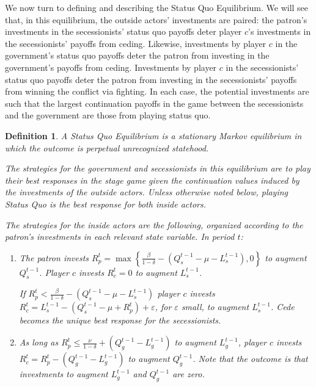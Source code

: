 \documentclass[11pt,letterpaper, notitlepage]{article}
\newtheorem{definition}{Definition}
\newcommand{\de}{\delta}
\newcommand{\ve}{\varepsilon}
\begin{document}
We now turn to defining and describing the Status Quo Equilibrium. We will see that, in this equilibrium, the outside actors' investments are paired: the patron's investments in the secessionists' status quo payoffs deter player $c$'s investments in the secessionists' payoffs from ceding. Likewise, investments by player $c$ in the government's status quo payoffs deter the patron from investing in the government's payoffs from ceding. Investments by player $c$ in the secessionists' status quo payoffs deter the patron from investing in the secessionists' payoffs from winning the conflict via fighting. In each case, the potential  investments are such that the largest continuation payoffs in the game between the secessionists and the government are those from playing status quo.

\begin{definition}
A Status Quo Equilibrium is a stationary Markov equilibrium in which the outcome is perpetual unrecognized statehood.

The strategies for the government and secessionists in this equilibrium are to play their best responses in the stage game given the continuation values induced by the investments of the outside actors. Unless otherwise noted below, playing Status Quo is the best response for both inside actors.

The strategies for the inside actors are the following, organized according to the patron's investments in each relevant state variable. In period $t$:

\begin{enumerate}
	\item The patron invests $R_p^t = \max\left\{\frac{\beta}{1-\de} - \left( Q_s^{t-1} - \mu - L_s^{t-1}\right),0\right\}$ to augment $Q_s^{t-1}$. Player $c$ invests $R_c^t =0$ to augment $L_s^{t-1}$.

If $R_p^t < \frac{\beta}{1-\de} - \left( Q_s^{t-1} - \mu - L_s^{t-1}\right)$ player $c$ invests $R_c^t = L_s^{t-1} - \left(Q_s^{t-1} - \mu + R_p^t \right) + \ve$, for $\ve$ small, to augment $L_s^{t-1}$. Cede becomes the unique best response for the secessionists.

	\item As long as $R_p^t \leq \frac{\nu}{1-\de} + \left( Q_g^{t-1} - L_g^{t-1}\right)$ to augment $L_g^{t-1}$, player $c$ invests $R_c^t = R_p^t - \left( Q_g^{t-1} - L_g^{t-1}\right)$ to augment $Q_g^{t-1}$. Note that the outcome is that investments to augment $L_g^{t-1}$ and $Q_g^{t-1}$ are zero.


\end{enumerate}
\end{definition}
\end{document}
